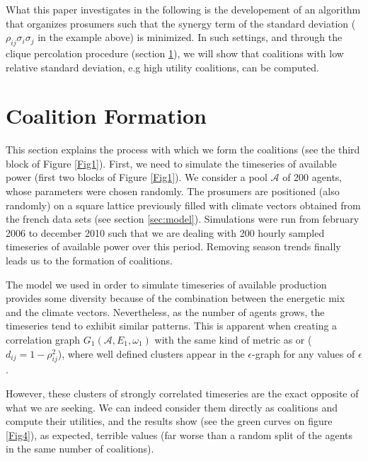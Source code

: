 \documentclass[conference]{IEEEtran}
\begin{document}
What this paper investigates in the following is the developement of an algorithm that organizes prosumers such that the synergy term of the standard deviation ( $ \rho_{ij}\sigma_{i}\sigma_{j} $ in the example above) is minimized. In such settings, and through the clique percolation procedure (section \ref{sec:forming}), we will show that coalitions with low relative standard deviation, e.g high utility coalitions, can be computed.


%
%

\section{Coalition Formation}
\label{sec:forming}

This section explains the process with which we form the coalitions (see the third block of Figure \ref{Fig1}). First, we need to simulate the timeseries of available power (first two blocks of Figure \ref{Fig1}). We consider a pool $ \mathcal{A} $ of 200 agents, whose parameters were chosen randomly. The prosumers are positioned (also randomly) on a square lattice previously filled with climate vectors obtained from the french data sets (see section \ref{sec:model}). Simulations were run from february 2006 to december 2010 such that we are dealing with 200 hourly sampled timeseries of available power over this period. Removing season trends finally leads us to the formation of coalitions. 

The model we used in order to simulate timeseries of available production provides some diversity because of the combination between the energetic mix and the climate vectors. Nevertheless, as the number of agents grows, the timeseries tend to exhibit similar patterns. This is apparent when creating a correlation graph $ G_{1}(\mathcal{A},E_{1},\omega_{1}) $ with the same kind of metric as \cite{Garas2008} or \cite{Onnela2004} ($ d_{ij} = 1 - \rho_{ij}^{2} $), where well defined clusters appear in the $ \epsilon $-graph for any values of $ \epsilon $. 

However, these clusters of strongly correlated timeseries are the exact opposite of what we are seeking. We can indeed consider them directly as coalitions and compute their utilities, and the results show (see the green curves on figure \ref{Fig4}), as expected, terrible values (far worse than a random split of the agents in the same number of coalitions).
\end{document}
